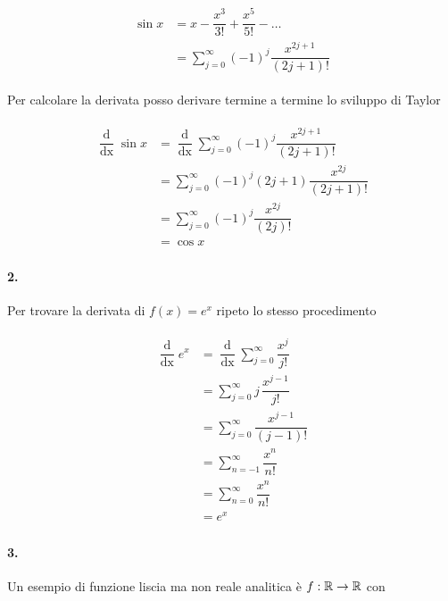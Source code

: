 \begin{align}
	\begin{split}
		\sin x &= x - \dfrac{x^{3}}{3!} + \dfrac{x^{5}}{5!} - \dots\\
		&= \sum_{j=0}^{\infty} (-1)^{j} \dfrac{x^{2j+1}}{(2j+1)!}
	\end{split}
\end{align}

Per calcolare la derivata posso derivare termine a termine lo sviluppo di Taylor

\begin{align}
	\begin{split}
		\dfrac{\operatorname{d}}{\operatorname{dx}} \sin x &= \dfrac{\operatorname{d}}{\operatorname{dx}} \sum_{j=0}^{\infty} (-1)^{j} \dfrac{x^{2j+1}}{(2j+1)!}\\
		&= \sum_{j=0}^{\infty} (-1)^{j} (2j+1) \dfrac{x^{2j}}{(2j+1)!}\\
		&= \sum_{j=0}^{\infty} (-1)^{j} \dfrac{x^{2j}}{(2j)!}\\
		&= \cos x
	\end{split}
\end{align}

\paragraph{2.}

Per trovare la derivata di $ f(x) = e^{x} $ ripeto lo stesso procedimento

\begin{align}
	\begin{split}
		\dfrac{\operatorname{d}}{\operatorname{dx}} e^{x} &= \dfrac{\operatorname{d}}{\operatorname{dx}} \sum_{j=0}^{\infty}\dfrac{x^{j}}{j!}\\
		&= \sum_{j=0}^{\infty} j \, \dfrac{x^{j-1}}{j!}\\
		&= \sum_{j=0}^{\infty} \dfrac{x^{j-1}}{(j-1)!}\\
		&= \sum_{n=-1}^{\infty} \dfrac{x^{n}}{n!}\\
		&= \sum_{n=0}^{\infty} \dfrac{x^{n}}{n!}\\
		&= e^{x}
	\end{split}
\end{align}

\paragraph{3.}

Un esempio di funzione liscia ma non reale analitica è $ f : \mathbb{R} \to \mathbb{R} $ con

